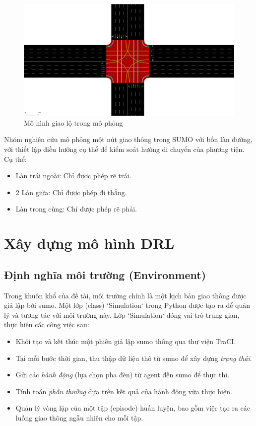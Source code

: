 \begin{figure}[!htp]
    \centering
    \includegraphics[width=\textwidth]{figures/sumo_map}
    \caption{Mô hình giao lộ trong mô phỏng}
    \label{fig:sumo_map}
\end{figure}

Nhóm nghiên cứu mô phỏng một nút giao thông trong SUMO với bốn làn đường, với thiết lập điều hướng cụ thể để kiểm soát hướng di chuyển của phương tiện. Cụ thể:
\begin{itemize}
    \item Làn trái ngoài: Chỉ được phép rẽ trái.

    \item 2 Làn giữa: Chỉ được phép đi thẳng.

    \item Làn trong cùng: Chỉ được phép rẽ phải.
\end{itemize}

\section{Xây dựng mô hình DRL}
\subsection{Định nghĩa môi trường (Environment)}
Trong khuôn khổ của đề tài, môi trường chính là một kịch bản giao thông được giả lập bởi \ac{sumo}. Một lớp (class) `Simulation` trong Python được tạo ra để quản lý và tương tác với môi trường này. Lớp `Simulation` đóng vai trò trung gian, thực
hiện các công việc sau:
\begin{itemize}
    \item Khởi tạo và kết thúc một phiên giả lập \ac{sumo} thông qua thư viện
        TraCI.

    \item Tại mỗi bước thời gian, thu thập dữ liệu thô từ \ac{sumo} để xây dựng \textit{trạng
        thái}.

    \item Gửi các \textit{hành động} (lựa chọn pha đèn) từ agent đến \ac{sumo} để
        thực thi.

    \item Tính toán \textit{phần thưởng} dựa trên kết quả của hành động vừa thực
        hiện.

    \item Quản lý vòng lặp của một tập (episode) huấn luyện, bao gồm việc tạo ra
        các luồng giao thông ngẫu nhiên cho mỗi tập.
\end{itemize}

